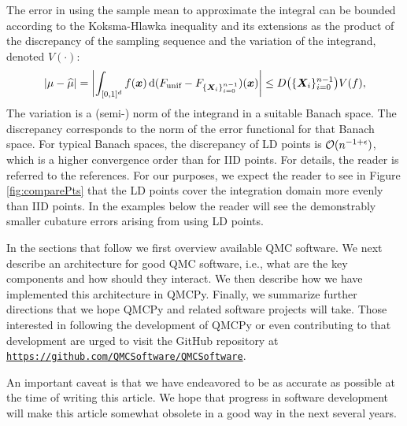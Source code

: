 \documentclass[graybox,footinfo]{svmult}
\newcommand{\QMCPYabs}[1]{\ensuremath{{\left \lvert #1 \right \rvert}}}
\newcommand{\QMCPYbiggabs}[1]{\ensuremath{{\biggl \lvert #1 \biggr \rvert}}}
\newcommand{\hmu}{\widehat{\mu}}
\newcommand{\unif}{\textup{unif}}
\newcommand{\cube}{[0,1]^d}
\begin{document}
The error in using the sample mean to approximate the integral can be bounded according to the Koksma-Hlawka inequality and its extensions \cite{DicEtal14a,Hic97a,Hic99a,Nie92} as the product of the discrepancy of the sampling sequence and the variation of the integrand, denoted $V(\cdot)$:
\begin{equation}
	\QMCPYabs{\mu - \hmu} = \QMCPYbiggabs{\int_{\cube} f(\bsx) \, \D (F_\unif - F_{\{\bsX_i\}_{i=0}^{n-1}}) (\bsx)} \le D\bigl(\{\bsX_i\}_{i=0}^{n-1}\bigr) V(f),
\end{equation} 
The variation is a (semi-) norm of the integrand in a suitable Banach space.  The discrepancy corresponds to the norm of the error functional for that Banach space.  For typical Banach spaces, the discrepancy of LD points is ${\mathcal{O}}(n^{-1+\epsilon})$, which is a higher convergence order than for IID points.  For details, the reader is referred to the references.  For our purposes, we expect the reader to see in Figure \ref{fig:comparePts} that the LD points cover the integration domain more evenly than IID points.  In the examples below the reader will see the demonstrably smaller cubature errors arising from using LD points.

In the sections that follow we first overview available QMC software.  We next describe an architecture for good QMC software, i.e., what are the key components and how should they interact.  We then describe how we have implemented this architecture in QMCPy.  Finally, we summarize further directions that we hope QMCPy and related software projects will take.  Those interested in following the development of QMCPy or even contributing to that development are urged to visit the GitHub repository at \href{https://github.com/QMCSoftware/QMCSoftware}{\nolinkurl{https://github.com/QMCSoftware/QMCSoftware}}.

An important caveat is that we have endeavored to be as accurate as possible at the time of writing this article.  We hope that progress in software development will make this article somewhat obsolete in a good way in the next several years.
\end{document}
